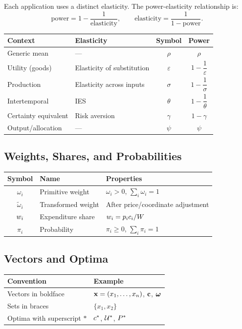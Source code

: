 Each application uses a distinct elasticity. The power-elasticity relationship is:
\[
\text{power} = 1 - \frac{1}{\text{elasticity}}, \qquad \text{elasticity} = \frac{1}{1 - \text{power}}.
\]

\begin{center}
\begin{tabular}{@{}llcc@{}}
\toprule
Context & Elasticity & Symbol & Power \\
\midrule
Generic mean & — & $\rho$ & $\rho$ \\[4pt]
Utility (goods) & Elasticity of substitution & $\varepsilon$ & $1 - \dfrac{1}{\varepsilon}$ \\[10pt]
Production & Elasticity across inputs & $\sigma$ & $1 - \dfrac{1}{\sigma}$ \\[10pt]
Intertemporal & IES & $\theta$ & $1 - \dfrac{1}{\theta}$ \\[10pt]
Certainty equivalent & Risk aversion & $\gamma$ & $1 - \gamma$ \\[4pt]
Output/allocation & — & $\psi$ & $\psi$ \\
\bottomrule
\end{tabular}
\end{center}

\subsection*{Weights, Shares, and Probabilities}

\begin{center}
\begin{tabular}{@{}cll@{}}
\toprule
Symbol & Name & Properties \\
\midrule
$\omega_i$ & Primitive weight & $\omega_i > 0$, $\sum_i \omega_i = 1$ \\
$\tilde{\omega}_i$ & Transformed weight & After price/coordinate adjustment \\
$w_i$ & Expenditure share & $w_i = p_i c_i / W$ \\
$\pi_i$ & Probability & $\pi_i \geq 0$, $\sum_i \pi_i = 1$ \\
\bottomrule
\end{tabular}
\end{center}

\subsection*{Vectors and Optima}

\begin{center}
\begin{tabular}{@{}ll@{}}
\toprule
Convention & Example \\
\midrule
Vectors in boldface & $\mathbf{x} = (x_1, \ldots, x_n)$, $\mathbf{c}$, $\boldsymbol{\omega}$ \\
Sets in braces & $\{x_1, x_2\}$ \\
Optima with superscript $*$ & $c^{*}$, $\mathcal{U}^{*}$, $P^{*}$ \\
\bottomrule
\end{tabular}
\end{center}

